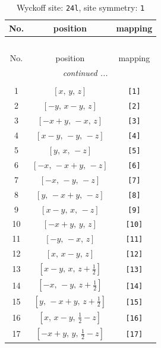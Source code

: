 \documentclass[fleqn,8pt]{jsarticle}
\begin{document}
\begin{longtable}{ccc}
\caption{Wyckoff site: {\tt 24l}, site symmetry: {\tt 1}}
 \\
 \hline \hline
No. & position & mapping \\ \hline \endfirsthead

\multicolumn{2}{l}{\tablename\ \thetable{}} \\
 \hline \hline
No. & position & mapping \\ \hline \endhead

 \hline \hline
\multicolumn{2}{r}{\footnotesize\it continued ...} \\ \endfoot

 \hline \hline
\multicolumn{2}{r}{} \\ \endlastfoot

1 & $\left[ x,\, y,\, z \right]$ & {\tt [1]} \\ \hline
2 & $\left[ - y,\, x - y,\, z \right]$ & {\tt [2]} \\ \hline
3 & $\left[ - x + y,\, - x,\, z \right]$ & {\tt [3]} \\ \hline
4 & $\left[ x - y,\, - y,\, - z \right]$ & {\tt [4]} \\ \hline
5 & $\left[ y,\, x,\, - z \right]$ & {\tt [5]} \\ \hline
6 & $\left[ - x,\, - x + y,\, - z \right]$ & {\tt [6]} \\ \hline
7 & $\left[ - x,\, - y,\, - z \right]$ & {\tt [7]} \\ \hline
8 & $\left[ y,\, - x + y,\, - z \right]$ & {\tt [8]} \\ \hline
9 & $\left[ x - y,\, x,\, - z \right]$ & {\tt [9]} \\ \hline
10 & $\left[ - x + y,\, y,\, z \right]$ & {\tt [10]} \\ \hline
11 & $\left[ - y,\, - x,\, z \right]$ & {\tt [11]} \\ \hline
12 & $\left[ x,\, x - y,\, z \right]$ & {\tt [12]} \\ \hline
13 & $\left[ x - y,\, x,\, z + \frac{1}{2} \right]$ & {\tt [13]} \\ \hline
14 & $\left[ - x,\, - y,\, z + \frac{1}{2} \right]$ & {\tt [14]} \\ \hline
15 & $\left[ y,\, - x + y,\, z + \frac{1}{2} \right]$ & {\tt [15]} \\ \hline
16 & $\left[ x,\, x - y,\, \frac{1}{2} - z \right]$ & {\tt [16]} \\ \hline
17 & $\left[ - x + y,\, y,\, \frac{1}{2} - z \right]$ & {\tt [17]} \\ \hline

\end{longtable}
\end{document}
